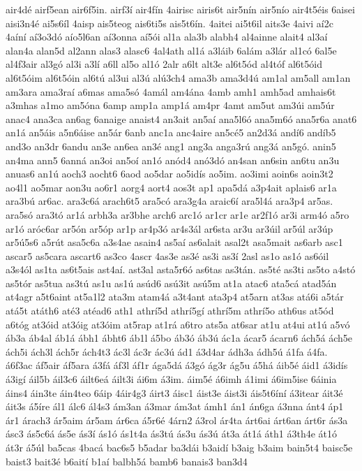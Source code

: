 {air4dé
airf5ean
air6f5in.
airf3í
air4fín
4airisc
airis6t
air5nín
air5nío
air4t5éis
6aisei
aisi3n4é
ai5s6íl
4aisp
ais5teog
ais6ti5s
ais5t6ín.
4aitei
ai5t6il
aits3e
4aivi
aí2c
4aíní
aí3o3dó
aío5l6an
aí3onna
aí5ói
al1a
ala3b
alabh4
al4ainne
alait4
al3aí
alan4a
alan5d
al2ann
alas3
alasc6
4al4ath
al1á
a3láib
6alám
a3lár
al1có
6al5e
al4f3air
al3gó
al3i
a3lí
a6ll
al5o
al1ó
2alr
a6lt
alt3e
al6t5ód
al4tóf
al6t5óid
al6t5óim
al6t5óin
al6tú
al3ui
al3ú
alú3ch4
ama3b
ama3d4ú
am1al
am5all
am1an
am3ara
ama3raí
a6mas
ama5só
4amál
am4ána
4amb
amh1
amh5ad
amhais6t
a3mhas
a1mo
am5óna
6amp
amp1a
amp1á
am4pr
4amt
am5ut
am3úi
am5úr
anac4
ana3ca
an6ag
6anaige
anaist4
an3ait
an5aí
ana5l6ó
ana5m6ó
ana5r6a
anat6
an1á
an5áis
a5n6áise
an5ár
6anb
anc1a
anc4aire
an5cé5
an2d3á
andí6
andíb5
and3o
an3dr
6andu
an3e
an6ea
an3é
ang1
ang3a
anga3rú
ang3á
an5gó.
anin5
an4ma
ann5
6anná
an3oi
an5oí
an1ó
anód4
anó3dó
an4san
an6sin
an6tu
an3u
anuas6
an1ú
aoch3
aocht6
6aod
ao5dar
ao5idís
ao5im.
ao3imi
aoin6s
aoin3t2
ao4l1
ao5mar
aon3u
ao6r1
aorg4
aort4
aos3t
ap1
apa5dá
a3p4ait
aplais6
ar1a
ara3bú
ar6ac.
ara3c6á
arach6t5
ara5có
ara3g4a
araic6í
ara5l4á
ara3p4
ar5as.
ara5só
ara3tó
ar1á
arbh3a
ar3bhe
arch6
arc1ó
ar1cr
ar1e
ar2f1ó
ar3i
arm4ó
a5ro
ar1ó
aróc6ar
ar5ón
ar5óp
ar1p
ar4p3ó
ar4s3ál
ar6sta
ar3u
ar3úil
ar5úl
ar3úp
ar5ú5s6
a5rút
asa5c6a
a3s4ae
asain4
as5aí
as6alait
asal2t
asa5mait
as6arb
asc1
ascar5
as5cara
ascart6
as3co
4ascr
4as3e
as3é
as3i
as3í
2asl
as1o
as1ó
as6óil
a3s4ól
as1ta
as6t5ais
ast4aí.
ast3al
asta5r6ó
as6tas
as3tán.
as5té
as3ti
as5to
a4stó
as5tór
as5tua
as3tú
as1u
as1ú
asúd6
asú3it
asú5m
at1a
atac6
ata5cá
atad5án
at4agr
a5t6aint
at5a1l2
ata3m
atam4á
a3t4ant
ata3p4
at5arn
at3as
atá6i
a5tár
atá5t
atáth6
até3
atéad6
ath1
athrí5d
athrí5gí
athrí5m
athrí5o
ath6us
at5ód
a6tóg
at3óid
at3óig
at3óim
at5rap
at1rá
a6tro
ats5a
at6sar
at1u
at4ui
at1ú
a5vó
áb3a
áb4al
áb1á
ábh1
ábht6
áb1l
á5bo
áb3ó
áb3ú
ác1a
ácar5
ácarn6
ách5á
ách5e
ách5i
ách3l
ách5r
ách4t3
ác3l
ác3r
ác3ú
ád1
á3d4ar
ádh3a
ádh5ú
á1fa
á4fa.
á6f3ac
áf5air
áf5ara
á3fá
áf3l
áf1r
ága5dá
á3gó
ág3r
ág5u
á5há
áib5é
áid1
á3idís
á3igí
áil5b
áil3c6
áilt6eá
áilt3i
ái6m
á3im.
áim5é
á6imh
á1imi
á6im5ise
6áinia
áins4
áin3te
áin4teo
6áip
4áir4g3
áirt3
áisc1
áist3e
áist3i
áis5t6íní
á3itear
áit3é
áit3s
á5íre
ál1
álc6
ál4s3
ám3an
á3mar
ám3at
ámh1
án1
án6ga
á3nna
ánt4
áp1
ár1
árach3
ár5aim
ár5am
ár6ca
á5r6é
4árn2
á3rol
ár4ta
árt6ai
árt6an
árt6r
ás3a
ásc3
ás5c6á
ás5e
ás3í
ás1ó
ás1t4a
ás3tú
ás3u
ás3ú
át3a
át1á
áth1
á3th4e
át1ó
át3r
á5úl
ba5cas
4bacá
bac6s5
b5adar
ba3dái
b3aidí
b3aig
b3aim
bain5t4
baisc5e
baist3
bait3é
b6aití
b1aí
balbh5á
bamb6
banais3
ban3d4
}
